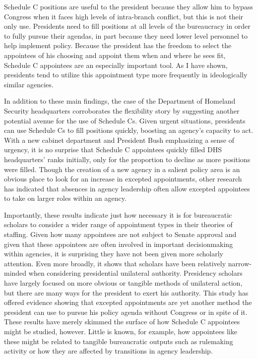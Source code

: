\documentclass[12pt]{article}
\begin{document}
Schedule C positions are useful to the president because they allow him to bypass Congress when it faces high levels of intra-branch conflict, but this is not their only use. Presidents need to fill positions at all levels of the bureaucracy in order to fully pursue their agendas, in part because they need lower level personnel to help implement policy. Because the president has the freedom to select the appointees of his choosing and appoint them when and where he sees fit, Schedule C appointees are an especially important tool. As I have shown, presidents tend to utilize this appointment type more frequently in ideologically similar agencies.

In addition to these main findings, the case of the Department of Homeland Security headquarters corroborates the flexibility story by suggesting another potential avenue for the use of Schedule Cs. Given urgent situations, presidents can use Schedule Cs to fill positions quickly, boosting an agency's capacity to act. With a new cabinet department and President Bush emphasizing a sense of urgency, it is no surprise that Schedule C appointees quickly filled DHS headquarters' ranks initially, only for the proportion to decline as more positions were filled. Though the creation of a new agency in a salient policy area is an obvious place to look for an increase in excepted appointments, other research has indicated that absences in agency leadership often allow excepted appointees to take on larger roles within an agency.

Importantly, these results indicate just how necessary it is for bureaucratic scholars to consider a wider range of appointment types in their theories of staffing. Given how many appointees are not subject to Senate approval and given that these appointees are often involved in important decisionmaking within agencies, it is surprising they have not been given more scholarly attention. Even more broadly, it shows that scholars have been relatively narrow-minded when considering presidential unilateral authority. Presidency scholars have largely focused on more obvious or tangible methods of unilateral action, but there are many ways for the president to exert his authority. This study has offered evidence showing that excepted appointments are yet another method the president can use to pursue his policy agenda without Congress or in spite of it. These results have merely skimmed the surface of how Schedule C appointees might be studied, however. Little is known, for example, how appointees like these might be related to tangible bureaucratic outputs such as rulemaking activity or how they are affected by transitions in agency leadership.
\end{document}
